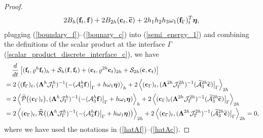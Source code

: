 \begin{proof}
\begin{multline}
2B_{h}({\bf f}_t,{\bf f}) + 2B_{2h}({\bf c}_t,\widetilde{\bf c}) + 2h_1h_2h_3\omega_1({\bf f}_\Gamma)_t^T{\bm \eta},
\end{multline}
plugging (\ref{boundary_f})--(\ref{bounary_c}) into (\ref{semi_energy_1}) and combining the definitions of the scalar product at the interface $\Gamma$ (\ref{scalar_product_discrete_interface_c}), we have
\begin{align*}\label{semi_energy_2}
&\hspace{0.4cm}\frac{d}{dt}\left[({\bf f}_t,\varrho^h {\bf f}_t)_{h} + \mathcal{S}_{h}({\bf f},{\bf f}_t) + ({\bf c}_t,\varrho^{2h} {\bf c}_t)_{2h} + \mathcal{S}_{2h}({\bf c},{\bf c}_t) \right]   \nonumber\\
& = 2\left<({\bf f}_\Gamma)_t,(\bm{\Lambda}^{h}\mathcal{J}^h_\Gamma)^{-1}(-(\mathcal{A}_3^h{\bf f})\big|_\Gamma+h\omega_1{\bm \eta})\right>_{h}+ 2\left<({\bf c}_\Gamma)_t,(\bm{\Lambda}^{2h}\mathcal{J}^{2h}_\Gamma)^{-1}(\wt{\mathcal{A}}_3^{2h}\wt{\bf c})\big|_\Gamma\right>_{2h} \nonumber\\
& = 2\left<\wt{\mathcal{P}}\big(({\bf c}_\Gamma)_t\big),(\bm{\Lambda}^{h}\mathcal{J}^h_\Gamma)^{-1}(-(\mathcal{A}_3^h{\bf f})\big|_\Gamma+h\omega_1{\bm \eta})\right>_{h}+ 2\left<({\bf c}_\Gamma)_t(\bm{\Lambda}^{2h}\mathcal{J}^{2h}_\Gamma)^{-1}(\wt{\mathcal{A}}_3^{2h}\wt{\bf c})\big|_\Gamma\right>_{2h} \nonumber\\
& = 2\left<({\bf c}_\Gamma)_t,\wt{\mathcal{R}}\big((\bm{\Lambda}^{h}\mathcal{J}^h_\Gamma)^{-1}(-(\mathcal{A}_3^h{\bf f})\big|_\Gamma+h\omega_1{\bm \eta})\big)\right>_{2h}+ 2\left<({\bf c}_\Gamma)_t,(\bm{\Lambda}^{2h}\mathcal{J}^{2h}_\Gamma)^{-1}(\wt{\mathcal{A}}_3^{2h}\wt{\bf c})\big|_\Gamma\right>_{2h} = 0,
\end{align*}
where we have used the notations in (\ref{hatAf})--(\ref{hatAc}).
\end{proof}